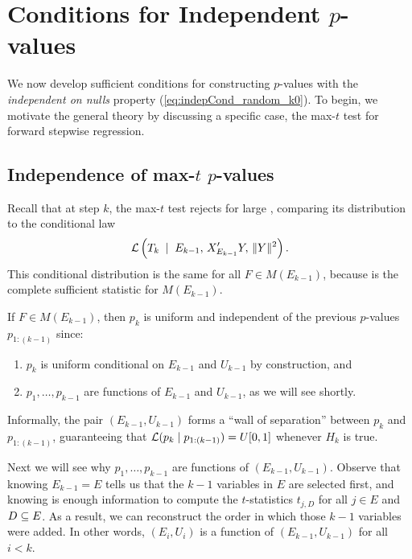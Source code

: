 \documentclass{article}
\begin{document}
\section{Conditions for Independent $p$-values}\label{sec:pValsIndep}

We now develop sufficient conditions for constructing $p$-values with the {\it independent on nulls} property (\ref{eq:indepCond_random_k0}). To begin, we motivate the general theory by discussing a specific case, the max-$t$ test for forward stepwise regression.

\subsection{Independence of max-$t$ $p$-values}

Recall that at step $k$, the max-$t$ test rejects for large , comparing its distribution to the conditional law
\begin{equation}\label{eq:maxTnull}
\mathcal{L}\left(T_k \; \mid \; E_{k-1}, \,X_{E_{k-1}}'Y, \,\|Y\|^2 \right).
\end{equation}
This conditional distribution is the same for all $F\in M(E_{k-1})$, because  is the complete sufficient statistic for $M(E_{k-1})$.

If $F\in M(E_{k-1})$, then $p_k$ is uniform and independent of the previous $p$-values $p_{1:(k-1)}$ since:
\begin{enumerate}
\item $p_k$ is uniform conditional on $E_{k-1}$ and $U_{k-1}$ by construction, and
\item $p_1, \ldots, p_{k-1}$ are functions of $E_{k-1}$ and $U_{k-1}$, as we will see shortly.
\end{enumerate}
Informally, the pair $(E_{k-1}, U_{k-1})$ forms a ``wall of separation'' between $p_k$ and $p_{1:(k-1)}$, guaranteeing that $\mathcal{L}(p_k \mid p_{1:(k-1)}) = U[0,1]$ whenever $H_k$ is true.

Next we will see why $p_1,\ldots,p_{k-1}$ are functions of $(E_{k-1},U_{k-1})$. Observe that knowing $E_{k-1}=E$ tells us that the $k-1$ variables in $E$ are selected first, and knowing  is enough information to compute the $t$-statistics $t_{j,D}$ for all $j\in E$ and $D\subseteq E$. As a result, we can reconstruct the order in which those $k-1$ variables were added. In other words, $(E_i, U_i)$ is a function of $(E_{k-1}, U_{k-1})$ for all $i<k$.
\end{document}
